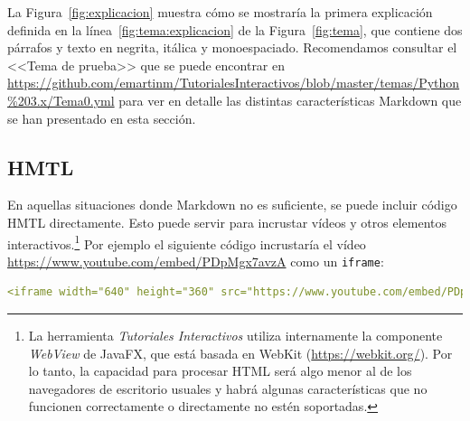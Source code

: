 \documentclass[]{article}
\newcommand{\code}[1]{{\lstinline[basicstyle=\ttfamily,mathescape]!#1!}}
\newcommand{\toolname}{\emph{Tutoriales Interactivos}}
\begin{document}
La Figura~\ref{fig:explicacion} muestra cómo se mostraría la primera explicación definida en la línea~\ref{fig:tema:explicacion} de la Figura~\ref{fig:tema}, que contiene dos párrafos y texto en negrita, itálica y monoespaciado. Recomendamos consultar el <<Tema de prueba>> que se puede encontrar en \url{https://github.com/emartinm/TutorialesInteractivos/blob/master/temas/Python%203.x/Tema0.yml} para ver en detalle las distintas características Markdown que se han presentado en esta sección.

\subsection{HMTL}
En aquellas situaciones donde Markdown no es suficiente, se puede incluir código HMTL directamente. Esto puede servir para incrustar vídeos y otros elementos interactivos.\footnote{La herramienta \toolname{} utiliza internamente la componente \emph{WebView} de JavaFX, que está basada en WebKit (\url{https://webkit.org/}). Por lo tanto, la capacidad para procesar HTML será algo menor al de los navegadores de escritorio usuales y habrá algunas características que no funcionen correctamente o directamente no estén soportadas.} Por ejemplo el siguiente código incrustaría el vídeo \url{https://www.youtube.com/embed/PDpMgx7avzA} como un \code{iframe}:
\begin{lstlisting}[language=yaml,numbers=none]
<iframe width="640" height="360" src="https://www.youtube.com/embed/PDpMgx7avzA" frameborder="0" allowfullscreen target="_self"></iframe>
\end{lstlisting}		
\end{document}
